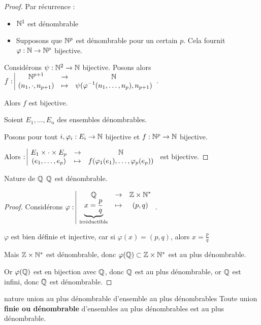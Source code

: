 \begin{proof}
    Par récurrence : 
    \begin{itemize}
        \item $\mathbb{N}^1$ est dénombrable 
        \item Supposons que $\mathbb{N}^p$ est dénombrable pour un certain $p$. Cela fournit $\varphi : \mathbb{N} \to \mathbb{N}^p$ bijective. 
    \end{itemize}

    Considérons $\psi : \mathbb{N}^2 \to \mathbb{N}$ bijective. Posons alors $f: \space \begin{array}{|ccc} \displaystyle \mathbb{N}^{p + 1} & \to & \displaystyle \mathbb{N} \\ \displaystyle (n_1, \cdot, n_{p + 1}) & \mapsto & \displaystyle \psi(\varphi^{-1}(n_1, \ldots, n_p), n_{p + 1}) \end{array}$.

    Alors $f$ est bijective. 

    \lvspace Soient $E_1, \ldots, E_n$ des ensembles dénombrables.

    Posons pour tout $i, \varphi_i : E_i \to \mathbb{N}$ bijective et $f : \mathbb{N}^p \to \mathbb{N}$ bijective.

    Alors $: \space \begin{array}{|ccc} \displaystyle E_1 \times \cdot \times E_p & \to & \displaystyle \mathbb{N} \\ \displaystyle (e_1, \ldots, e_p) & \mapsto & \displaystyle f(\varphi_1(e_1), \ldots, \varphi_p(e_p)) \end{array}$ est bijective.
\end{proof}


\begin{theoreme}{Nature de $\mathbb{Q}$}{}
    $\mathbb{Q}$ est dénombrable. 
\end{theoreme}


\begin{proof}
    Considérons $\varphi: \space \begin{array}{|ccc} \displaystyle \mathbb{Q} & \to & \displaystyle \mathbb{Z} \times \mathbb{N}^* \\ \displaystyle \underbrace{ x = \frac p q}_{\text{irréductible}}  & \mapsto & \displaystyle (p, q) \end{array}$.

    $\varphi$ est bien définie et injective, car si $\varphi(x) = (p, q)$, alors $x = \frac p q$

    Mais $\mathbb{Z} \times \mathbb{N}^*$ est dénombrable, donc $\varphi(\mathbb{Q}) \subset \mathbb{Z} \times \mathbb{N}^*$ est 
    au plus dénombrable. 

    Or $\varphi(\mathbb{Q})$ est en bijection avec $\mathbb{Q}$, donc $\mathbb{Q}$ est au plus dénombrable, or $\mathbb{Q}$ est 
    infini, donc $\mathbb{Q}$ est dénombrable.
\end{proof}

\begin{theorement}{nature union au plus dénombrable d'ensemble au plus dénombrables}{}
    Toute union \textbf{finie ou dénombrable} d'ensembles au plus dénombrables est au plus dénombrable. 
\end{theorement}

